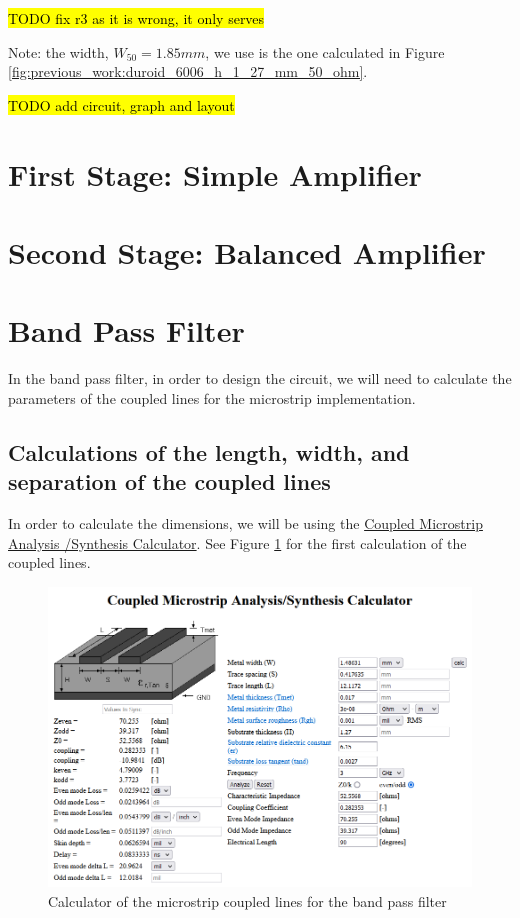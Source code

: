 \documentclass[12pt]{report} %
\newcommand{\todo}[1]{\sethlcolor{green}\hl{TODO #1}}
\begin{document}
\todo{fix r3 as it is wrong, it only serves}

Note: the width, $W_{50} = 1.85 mm$, we use is the one calculated in Figure \ref{fig:previous_work:duroid_6006_h_1_27_mm_50_ohm}.

\todo{add circuit, graph and layout}

\section{First Stage: Simple Amplifier}


\section{Second Stage: Balanced Amplifier}

\section{Band Pass Filter}

In the band pass filter, in order to design the circuit, we will need to calculate the parameters of the coupled lines for the microstrip implementation.

\subsection{Calculations of the length, width, and separation of the coupled lines}

In order to calculate the dimensions, we will be using the \href{https://wcalc.sourceforge.net/cgi-bin/coupled_microstrip.cgi}{Coupled Microstrip Analysis /Synthesis Calculator}. See Figure \ref{fig:microstrip_elements:filter_band_pass_microstrip_calculator} for the first calculation of the coupled lines.

\begin{figure}[htbp]
    \centering
    \includegraphics[width=1\linewidth]{images//microstrip_elements/filter_band_pass_microstrip_calculator.png}
    \caption{Calculator of the microstrip coupled lines for the band pass filter}
    \label{fig:microstrip_elements:filter_band_pass_microstrip_calculator}
\end{figure}
\end{document}
